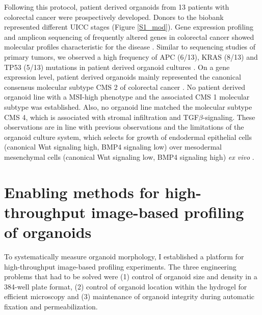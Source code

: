 \begin{flushleft}
Following this protocol, patient derived organoids from 13 patients with colorectal cancer were prospectively developed. Donors to the biobank represented different UICC stages (Figure \ref{S1_mod}). Gene expression profiling and amplicon sequencing of frequently altered genes in colorectal cancer showed molecular profiles characteristic for the disease . Similar to sequencing studies of primary tumors, we observed a high frequency of APC (6/13), KRAS (8/13) and TP53 (5/13) mutations in patient derived organoid cultures \cite{Muzny2012-hr}. On a gene expression level, patient derived organoids mainly represented the canonical consensus molecular subtype CMS 2 of colorectal cancer \cite{Guinney2015-ex}. No patient derived organoid line with a MSI-high phenotype and the associated CMS 1 molecular subtype was established. Also, no organoid line matched the molecular subtype CMS 4, which is associated with stromal infiltration and TGF\(\beta\)-signaling. These observations are in line with previous observations \cite{Van_De_Wetering2015-ko, Schutte2017-fl} and the limitations of the organoid culture system, which selects for growth of  endodermal epithelial cells (canonical Wnt signaling high, BMP4 signaling low) over mesodermal mesenchymal cells (canonical Wnt signaling low, BMP4 signaling high) \textit{ex vivo} \cite{Sato2011-lh}.

\section{Enabling methods for high-throughput image-based profiling of organoids}
To systematically measure organoid morphology, I established a platform for high-throughput image-based profiling experiments. The three engineering problems that had to be solved were (1) control of organoid size and density in a 384-well plate format, (2) control of organoid location within the hydrogel for efficient microscopy and (3) maintenance of organoid integrity during automatic fixation and permeabilization. 

\bigbreak


\end{flushleft}
